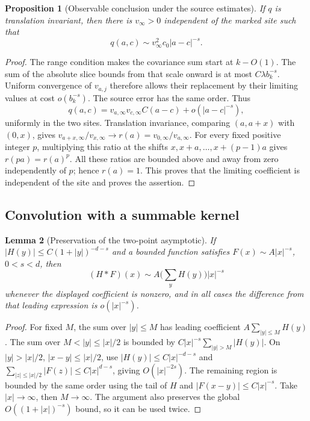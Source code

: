 \documentclass[11pt]{article}
\newtheorem{proposition}{Proposition}[section]
\newtheorem{lemma}[proposition]{Lemma}
\begin{document}
\begin{proposition}[Observable conclusion under the source estimates]
\label{frac:prop:observable}
If \(q\) is translation invariant, then there is \(v_\infty>0\)
independent of the marked site such that
\[
 q(a,c)\sim v_\infty^2 c_0|a-c|^{-s}.
\]
\end{proposition}
\begin{proof}
The range condition makes the covariance sum start at \(k-O(1)\).
The sum of the absolute slice bounds from that scale onward is at most
\(C\lambda b_k^{-s}\). Uniform convergence of \(v_{a,j}\) therefore
allows their replacement by their limiting values at cost
\(o(b_k^{-s})\). The source error has the same order. Thus
\[
 q(a,c)=v_{a,\infty}v_{c,\infty}C(a-c)+o(|a-c|^{-s}),
\]
uniformly in the two sites.
Translation invariance, comparing \((a,a+x)\) with \((0,x)\), gives
\(v_{a+x,\infty}/v_{x,\infty}\to
r(a)=v_{0,\infty}/v_{a,\infty}\). For every fixed positive integer
\(p\), multiplying this ratio at the shifts \(x,x+a,\ldots,x+(p-1)a\)
gives \(r(pa)=r(a)^p\). All these ratios are bounded above and
away from zero independently of \(p\); hence \(r(a)=1\).
This proves that the limiting coefficient is independent of the site
and proves the assertion.
\end{proof}


\subsection{Convolution with a summable kernel}

\begin{lemma}[Preservation of the two-point asymptotic]
If \(|H(y)|\le C(1+|y|)^{-d-s}\) and a bounded
function satisfies \(F(x)\sim A|x|^{-s}\), \(0<s<d\), then
\begin{equation}\label{frac:convolution}
 (H*F)(x)\sim A\Big(\sum_yH(y)\Big)|x|^{-s}
\end{equation}
whenever the displayed coefficient is nonzero, and in all cases
the difference from that leading expression is \(o(|x|^{-s})\).
\end{lemma}

\begin{proof}
For fixed \(M\), the sum over \(|y|\le M\) has leading coefficient
\(A\sum_{|y|\le M} H(y)\). The sum over \(M<|y|\le|x|/2\)
is bounded by \(C|x|^{-s}\sum_{|y|>M}|H(y)|\). On
\(|y|>|x|/2\), \(|x-y|\le |x|/2\), use
\(|H(y)|\le C|x|^{-d-s}\) and
\(\sum_{|z|\le |x|/2}|F(z)|\le C|x|^{d-s}\), giving
\(O(|x|^{-2s})\). The remaining region is bounded by the same
order using the tail of \(H\) and \(|F(x-y)|\le C|x|^{-s}\).
Take \(|x|\to\infty\), then \(M\to\infty\). The argument also
preserves the global \(O((1+|x|)^{-s})\) bound, so it can be used twice.
\end{proof}
\end{document}
